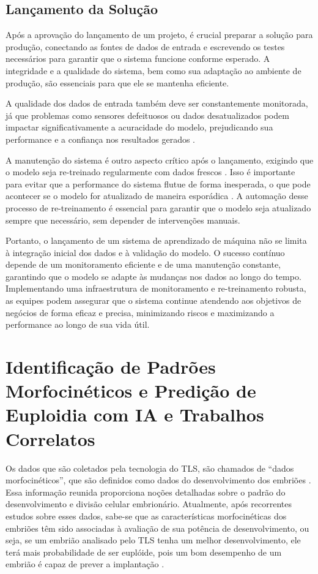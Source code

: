 \subsection{Lançamento da Solução}
Após a aprovação do lançamento de um projeto, é crucial preparar a solução para produção, conectando as fontes de dados de entrada e escrevendo os testes necessários para garantir que o sistema funcione conforme esperado. A integridade e a qualidade do sistema, bem como sua adaptação ao ambiente de produção, são essenciais para que ele se mantenha eficiente.

A qualidade dos dados de entrada também deve ser constantemente monitorada, já que problemas como sensores defeituosos ou dados desatualizados podem impactar significativamente a acuracidade do modelo, prejudicando sua performance e a confiança nos resultados gerados  \cite{muller2017}.

A manutenção do sistema é outro aspecto crítico após o lançamento, exigindo que o modelo seja re-treinado regularmente com dados frescos \cite{geron2017}. Isso é importante para evitar que a performance do sistema flutue de forma inesperada, o que pode acontecer se o modelo for atualizado de maneira esporádica \cite{geron2017}. A automação desse processo de re-treinamento é essencial para garantir que o modelo seja atualizado sempre que necessário, sem depender de intervenções manuais. 

Portanto, o lançamento de um sistema de aprendizado de máquina não se limita à integração inicial dos dados e à validação do modelo. O sucesso contínuo depende de um monitoramento eficiente e de uma manutenção constante, garantindo que o modelo se adapte às mudanças nos dados ao longo do tempo. Implementando uma infraestrutura de monitoramento e re-treinamento robusta, as equipes podem assegurar que o sistema continue atendendo aos objetivos de negócios de forma eficaz e precisa, minimizando riscos e maximizando a performance ao longo de sua vida útil.

\section{Identificação de Padrões Morfocinéticos e Predição de Euploidia com IA e Trabalhos Correlatos}

Os dados que são coletados pela tecnologia do TLS, são chamados de “dados morfocinéticos”, que são definidos como dados do desenvolvimento dos embriões \cite{moustakli2024}. Essa informação reunida proporciona noções detalhadas sobre o padrão do desenvolvimento e divisão celular embrionário. Atualmente, após recorrentes estudos sobre esses dados, sabe-se que as características morfocinéticas dos embriões têm sido associadas à avaliação de sua potência de desenvolvimento, ou seja, se um embrião analisado pelo TLS tenha um melhor desenvolvimento, ele terá mais probabilidade de ser euplóide, pois um bom desempenho de um embrião é capaz de prever a implantação \cite{yuan2023}. 

